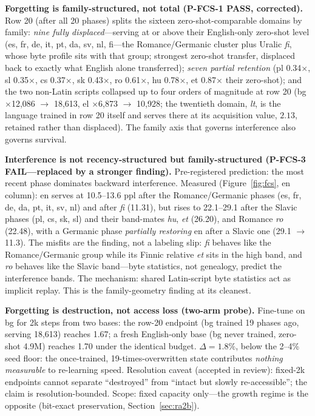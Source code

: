 \documentclass[11pt]{article}
\theoremstyle{definition}\newtheorem{definition}{Definition}
\theoremstyle{remark}\newtheorem{remark}{Remark}
\begin{document}
\textbf{Forgetting is family-structured, not total (P-FCS-1 PASS, corrected).} Row 20
(after all 20 phases) splits the sixteen zero-shot-comparable domains by family:
\emph{nine fully displaced}---serving at or above their English-only zero-shot level (es,
fr, de, it, pt, da, sv, nl, fi---the Romance/Germanic cluster plus Uralic \emph{fi}, whose
byte profile sits with that group; strongest zero-shot transfer,
displaced back to exactly what English alone transferred); \emph{seven partial retention}
(pl 0.34$\times$, sl 0.35$\times$, cs 0.37$\times$, sk 0.43$\times$, ro 0.61$\times$,
hu 0.78$\times$, et 0.87$\times$ their zero-shot); and the two non-Latin scripts collapsed up to four orders of magnitude at row 20 (bg $\times$12{,}086 $\to$ 18{,}613, el $\times$6{,}873 $\to$ 10{,}928; the twentieth domain, \emph{lt}, is the language trained in row 20 itself and serves there at its acquisition value, $2.13$, retained rather than displaced). The family axis that governs
interference also governs survival.

\textbf{Interference is not recency-structured but family-structured (P-FCS-3
FAIL---replaced by a stronger finding).} Pre-registered prediction: the most recent phase
dominates backward interference. Measured (Figure~\ref{fig:fcs}, en column): en serves at
10.5--13.6 ppl after the Romance/Germanic phases (es, fr, de, da, pt, it, sv, nl) and after
\emph{fi} (11.31), but rises to 22.1--29.1 after the Slavic phases (pl, cs, sk, sl) and
their band-mates \emph{hu}, \emph{et} (26.20), and Romance \emph{ro} (22.48), with a
Germanic phase \emph{partially restoring} en after a Slavic one (29.1 $\to$ 11.3). The
misfits are the finding, not a labeling slip: \emph{fi} behaves like the Romance/Germanic
group while its Finnic relative \emph{et} sits in the high band, and \emph{ro} behaves like
the Slavic band---byte statistics, not genealogy, predict the interference bands. The
mechanism: shared Latin-script byte statistics act as implicit replay. This is the
family-geometry finding at its cleanest.

\textbf{Forgetting is destruction, not access loss (two-arm probe).} Fine-tune on bg for
2k steps from two bases: the row-20 endpoint (bg trained 19 phases ago, serving 18{,}613)
reaches 1.67; a fresh English-only base (bg never trained, zero-shot 4.9M) reaches 1.70
under the identical budget. $\Delta=1.8\%$, below the 2--4\% seed floor: the once-trained,
19-times-overwritten state contributes \emph{nothing measurable} to re-learning speed.
Resolution caveat (accepted in review): fixed-2k endpoints cannot separate ``destroyed''
from ``intact but slowly re-accessible''; the claim is resolution-bounded. Scope: fixed
capacity only---the growth regime is the opposite (bit-exact preservation,
Section~\ref{sec:ra2b}).
\end{document}
